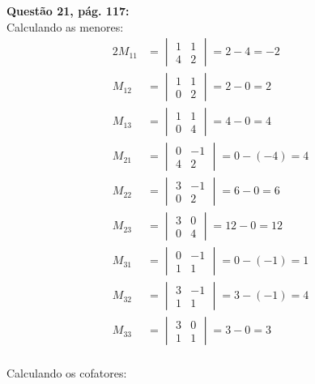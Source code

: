 \documentclass[a4paper,12pt]{article}
\begin{document}
\textbf{Questão 21, pág. 117:}\\

Calculando as menores:
\begin{alignat*}{2}
  M_{11} &=
  \begin{vmatrix}
    1 & 1\\
    4 & 2
  \end{vmatrix}
  = 2 - 4 = -2 \\
  M_{12} &=
  \begin{vmatrix}
    1 & 1\\
    0 & 2
  \end{vmatrix}
  = 2 - 0 = 2 \\
  M_{13} &=
  \begin{vmatrix}
    1 & 1\\
    0 & 4
  \end{vmatrix}
  = 4 - 0 = 4 \\
  M_{21} &=
  \begin{vmatrix}
    0 & -1\\
    4 & 2
  \end{vmatrix}
  = 0 - (-4) = 4 \\
  M_{22} &=
  \begin{vmatrix}
    3 & -1\\
    0 & 2
  \end{vmatrix}
  = 6 - 0 = 6 \\
  M_{23} &=
  \begin{vmatrix}
    3 & 0\\
    0 & 4
  \end{vmatrix}
  = 12 - 0 = 12 \\
  M_{31} &=
  \begin{vmatrix}
    0 & -1\\
    1 & 1
  \end{vmatrix}
  = 0 - (-1) = 1 \\
  M_{32} &=
  \begin{vmatrix}
    3 & -1\\
    1 & 1
  \end{vmatrix}
  = 3 - (-1) = 4 \\
  M_{33} &=
  \begin{vmatrix}
    3 & 0\\
    1 & 1
  \end{vmatrix}
  = 3 - 0 = 3 \\
\end{alignat*}

Calculando os cofatores:
\end{document}

